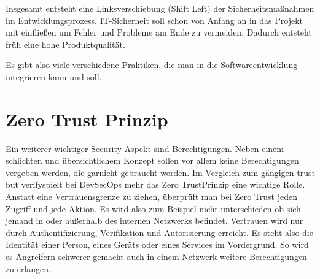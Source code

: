 Insgesamt entsteht eine Linksverschiebung (Shift Left) der Sicherheitsmaßnahmen im Entwicklungsprozess. IT-Sicherheit soll schon von Anfang an in das Projekt mit einfließen um Fehler und Probleme am Ende zu vermeiden. Dadurch entsteht früh eine hohe Produktqualität. \cite{Luber2022-xh}

Es gibt also viele verschiedene Praktiken, die man in die Softwareentwicklung integrieren kann und soll.

\section{Zero Trust Prinzip}
Ein weiterer wichtiger Security Aspekt sind Berechtigungen. Neben einem schlichten und übersichtlichem Konzept sollen vor allem keine Berechtigungen vergeben werden, die garnicht gebraucht werden. Im Vergleich zum gängigen \glqq trust but verify\grqq  spielt bei DevSecOps mehr das \glqq Zero Trust\grqq   Prinzip eine wichtige Rolle. Anstatt eine Vertrauensgrenze zu ziehen, überprüft man bei Zero Trust jeden Zugriff und jede Aktion. Es wird also zum Beispiel nicht unterschieden ob sich jemand in oder außerhalb des internen Netzwerks befindet. Vertrauen wird nur durch Authentifizierung, Verifikation und Autorisierung erreicht. Es steht also die Identität einer Person, eines Geräts oder eines Services im Vordergrund. So wird es Angreifern schwerer gemacht auch in einem Netzwerk weitere Berechtigungen zu erlangen. \cite{zero-trust}


